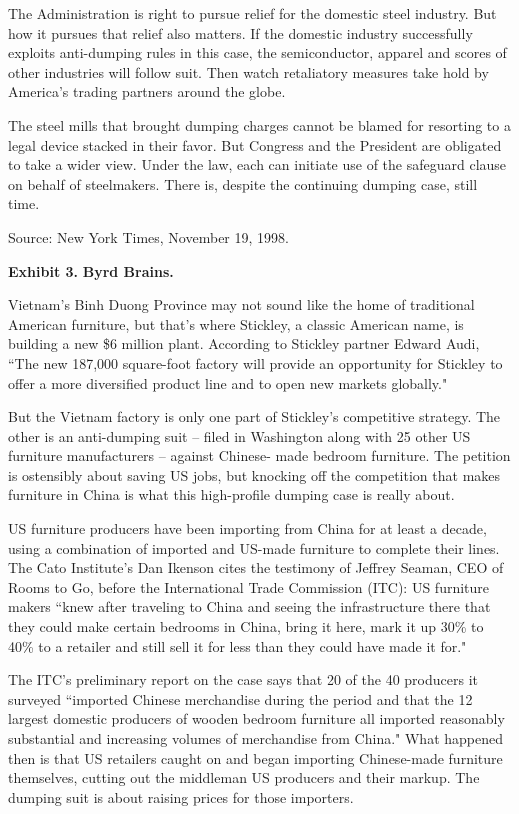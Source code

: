 \documentclass[letterpaper,12pt]{article}
\begin{document}
The Administration is right to pursue relief for the domestic steel industry. But how it pursues that relief also matters. If the domestic industry successfully exploits anti-dumping rules in this case, the semiconductor, apparel and scores of other industries will follow suit. Then watch retaliatory measures take hold by America's trading partners around the globe.

The steel mills that brought dumping charges cannot be blamed for resorting to a legal device stacked in their favor. But Congress and the President are obligated to take a wider view. Under the law, each can initiate use of the safeguard clause on behalf of steelmakers. There is, despite the continuing dumping case, still time.


Source:  New York Times, November 19, 1998.  


\pagebreak%
{\bf Exhibit 3.} {\bf Byrd Brains.} 

Vietnam's Binh Duong Province may not sound like the home of traditional American furniture, but that's where Stickley, a classic American name, is building a new \$6 million plant. According to Stickley partner Edward Audi, ``The new 187,000 square-foot factory will provide an opportunity for Stickley to offer a more diversified product line and to open new markets globally."

But the Vietnam factory is only one part of Stickley's competitive strategy. The other is an anti-dumping suit -- filed in Washington along with 25 other US furniture manufacturers -- against Chinese- made bedroom furniture. The petition is ostensibly about saving US jobs, but knocking off the competition that makes furniture in China is what this high-profile dumping case is really about.

US furniture producers have been importing from China for at least a decade, using a combination of imported and US-made furniture to complete their lines. The Cato Institute's Dan Ikenson cites the testimony of Jeffrey Seaman, CEO of Rooms to Go, before the International Trade Commission (ITC): US furniture makers ``knew after traveling to China and seeing the infrastructure there that they could make certain bedrooms in China, bring it here, mark it up 30\% to 40\% to a retailer and still sell it for less than they could have made it for."

The ITC's preliminary report on the case says that 20 of the 40 producers it surveyed ``imported Chinese merchandise during the period and that the 12 largest domestic producers of wooden bedroom furniture all imported reasonably substantial and increasing volumes of merchandise from China." What happened then is that US retailers caught on and began importing Chinese-made furniture themselves, cutting out the middleman US producers and their markup. The dumping suit is about raising prices for those importers.
\end{document}
